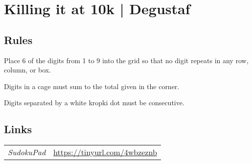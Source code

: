 \section{Killing it at 10k | {\normalfont Degustaf}}
\label{sec:34-killing-it-at-10k-degustaf}

\subsection*{Rules}
\begin{markdown}
Place 6 of the digits from 1 to 9 into the grid so that no digit repeats in any row, column, or box.

Digits in a cage must sum to the total given in the corner.

Digits separated by a white kropki dot must be consecutive.
\end{markdown}
\subsection*{Links}
\begin{tabularx}{\textwidth}{l X}
\emph{SudokuPad} & \url{https://tinyurl.com/4wbzeznb} \\
\end{tabularx}
\pagebreak
